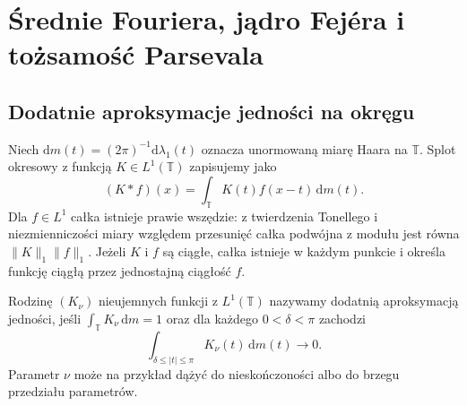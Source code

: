 \section{Średnie Fouriera, jądro Fejéra i tożsamość Parsevala}
\providecommand{\atlasref}[2]{#2}

\subsection{Dodatnie aproksymacje jedności na okręgu}

Niech $\mathrm dm(t)=(2\pi)^{-1}\mathrm d\lambda_1(t)$
oznacza unormowaną miarę Haara na $\mathbb T$.
Splot okresowy z funkcją $K\in L^1(\mathbb T)$
zapisujemy jako
\[
 (K*f)(x)=\int_{\mathbb T}K(t)f(x-t)\,\mathrm dm(t).
\]
Dla $f\in L^1$ całka istnieje prawie wszędzie:
z twierdzenia Tonellego i niezmienniczości miary
względem przesunięć całka podwójna z modułu
jest równa $\|K\|_1\|f\|_1$.
Jeżeli $K$ i $f$ są ciągłe, całka istnieje
w każdym punkcie i określa funkcję ciągłą
przez jednostajną ciągłość $f$.

\begin{definicja}
\label{def:dt-periodic-approximate-identity}
Rodzinę $(K_\nu)$ nieujemnych funkcji z
$L^1(\mathbb T)$ nazywamy dodatnią aproksymacją
jedności, jeśli $\int_{\mathbb T} K_\nu\,\mathrm dm=1$
oraz dla każdego $0<\delta<\pi$ zachodzi
\[
 \int_{\delta\le |t|\le\pi}K_\nu(t)\,\mathrm dm(t)
 \longrightarrow0.
\]
Parametr $\nu$ może na przykład dążyć do
nieskończoności albo do brzegu przedziału parametrów.
\end{definicja}

